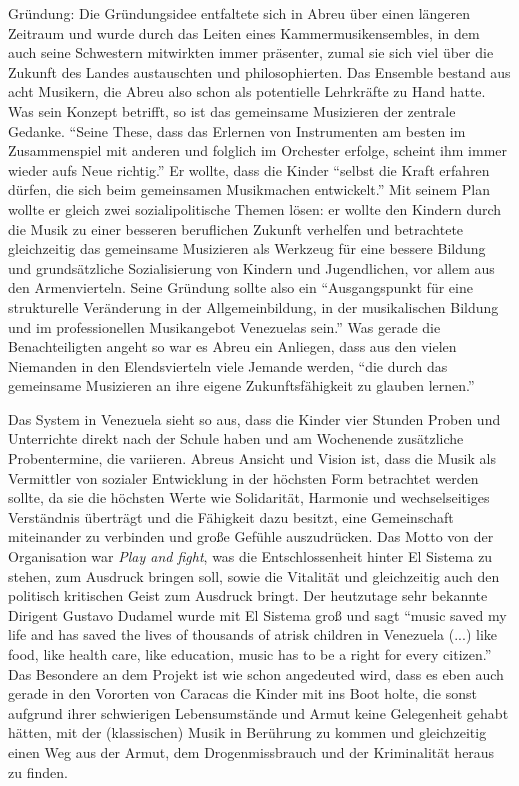 Gründung: Die Gründungsidee entfaltete sich in Abreu über einen längeren
Zeitraum und wurde durch das Leiten eines Kammermusikensembles, in dem auch
seine Schwestern mitwirkten immer präsenter, zumal sie sich viel über die
Zukunft des Landes
austauschten und philosophierten. Das Ensemble bestand aus acht Musikern, die
Abreu also schon als potentielle Lehrkräfte zu Hand hatte.
\autocite[34]{kaufmann:el_sistema} Was sein Konzept betrifft, so ist das
gemeinsame Musizieren der zentrale Gedanke. \enquote{Seine These, dass das
Erlernen von Instrumenten am besten im Zusammenspiel mit anderen und folglich im
Orchester erfolge, scheint ihm immer wieder aufs Neue
richtig.}\autocite[34]{kaufmann:el_sistema} Er wollte, dass die Kinder
\enquote{selbst die Kraft erfahren dürfen, die sich beim gemeinsamen Musikmachen
entwickelt.}\autocite[34]{kaufmann:el_sistema} Mit seinem Plan wollte er gleich
zwei sozialipolitische Themen lösen: er wollte den Kindern durch die Musik zu
einer besseren beruflichen Zukunft verhelfen und betrachtete gleichzeitig das
gemeinsame Musizieren als Werkzeug für eine bessere Bildung und grundsätzliche
Sozialisierung von Kindern und Jugendlichen, vor allem aus den Armenvierteln.
Seine Gründung sollte also ein \enquote{Ausgangspunkt für eine strukturelle
Veränderung in der Allgemeinbildung, in der musikalischen Bildung und im
professionellen Musikangebot Venezuelas sein.}\autocite[38]{kaufmann:el_sistema}
Was gerade die Benachteiligten angeht so war es Abreu ein Anliegen, dass aus den
vielen Niemanden in den Elendsvierteln viele Jemande werden, \enquote{die durch
das gemeinsame Musizieren an ihre eigene Zukunftsfähigkeit zu glauben
lernen.}\autocite[39]{kaufmann:el_sistema}

Das System in Venezuela sieht so aus,
dass die Kinder vier Stunden Proben und Unterrichte direkt nach der Schule haben
und am Wochenende zusätzliche Probentermine, die variieren. Abreus Ansicht und
Vision ist, dass die Musik als Vermittler von sozialer Entwicklung in der
höchsten Form betrachtet werden sollte, da sie die höchsten Werte wie
Solidarität, Harmonie und wechselseitiges Verständnis überträgt und die
Fähigkeit dazu besitzt, eine Gemeinschaft miteinander zu verbinden und große
Gefühle auszudrücken. Das Motto von der Organisation war \emph{Play and fight},
was die Entschlossenheit hinter El Sistema zu stehen, zum Ausdruck bringen soll,
sowie die Vitalität und gleichzeitig auch den politisch kritischen Geist zum
Ausdruck bringt. Der heutzutage sehr bekannte Dirigent Gustavo Dudamel wurde mit
El Sistema groß und sagt \enquote{music saved my life and has saved the lives of
thousands of atrisk children in Venezuela (...) like food, like health care,
like education, music has to be a right for every
citizen.}\autocite{wikipedia:el_sistema} Das Besondere an dem Projekt ist wie
schon angedeuted wird, dass es eben auch gerade in den Vororten von Caracas die
Kinder mit ins Boot holte, die sonst aufgrund ihrer schwierigen Lebensumstände
und Armut keine Gelegenheit gehabt hätten, mit der (klassischen) Musik in
Berührung zu kommen und gleichzeitig einen Weg aus der Armut, dem
Drogenmissbrauch und der Kriminalität heraus zu finden.

